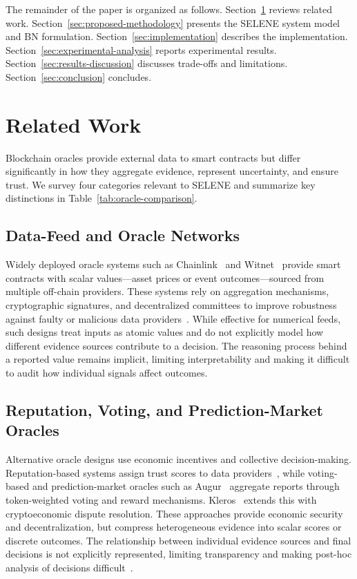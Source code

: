 \documentclass[journal]{IEEEtran}
\begin{document}
The remainder of the paper is organized as follows.
Section~\ref{sec:relatedwork} reviews related work.
Section~\ref{sec:proposed-methodology} presents the SELENE
system model and BN formulation.
Section~\ref{sec:implementation} describes the
implementation.
Section~\ref{sec:experimental-analysis} reports
experimental results.
Section~\ref{sec:results-discussion} discusses trade-offs
and limitations.
Section~\ref{sec:conclusion} concludes.


\section{Related Work}
\label{sec:relatedwork}

Blockchain oracles provide external data to smart
contracts but differ significantly in how they aggregate
evidence, represent uncertainty, and ensure trust.
We survey four categories relevant to SELENE and summarize
key distinctions in Table~\ref{tab:oracle-comparison}.

\subsection{Data-Feed and Oracle Networks}

Widely deployed oracle systems such as
Chainlink~\cite{breidenbach2021chainlink} and
Witnet~\cite{de2017witnet} provide smart contracts
with scalar values---asset prices or event
outcomes---sourced from multiple off-chain providers.
These systems rely on aggregation mechanisms,
cryptographic signatures, and decentralized committees
to improve robustness against faulty or malicious data
providers~\cite{pasdar2023connect,ezzat2022blockchain,mammadzada2020blockchain}.
While effective for numerical feeds, such designs treat
inputs as atomic values and do not explicitly model how
different evidence sources contribute to a decision.
The reasoning process behind a reported value remains
implicit, limiting interpretability and making it
difficult to audit how individual signals affect
outcomes.

\subsection{Reputation, Voting, and Prediction-Market
Oracles}

Alternative oracle designs use economic incentives and
collective decision-making.
Reputation-based systems assign trust scores to data
providers~\cite{chen2022decentralized,nelaturu2020public,
arshad2022reputable}, while voting-based and
prediction-market oracles such as
Augur~\cite{peterson2015augur} aggregate reports through
token-weighted voting and reward mechanisms.
Kleros~\cite{lesaege2019kleros} extends this with
cryptoeconomic dispute resolution.
These approaches provide economic security and
decentralization, but compress heterogeneous evidence
into scalar scores or discrete outcomes.
The relationship between individual evidence sources and
final decisions is not explicitly represented, limiting
transparency and making post-hoc analysis of decisions
difficult~\cite{pasdar2021blockchain}.
\end{document}
